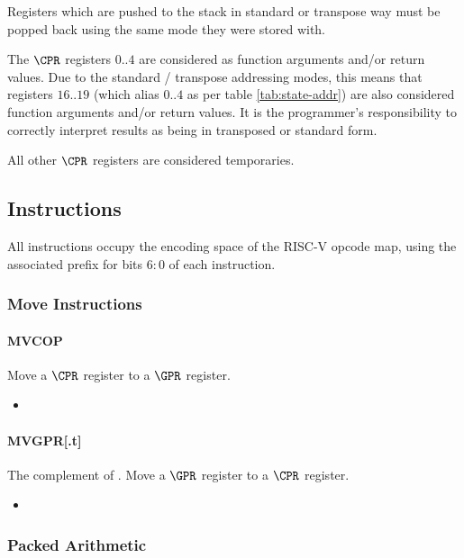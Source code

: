Registers which are pushed to the stack in standard or transpose
way must be popped back using the same mode they were stored with.

The $\CPR$ registers $0..4$ are considered as function arguments
and/or return values. Due to the standard / transpose addressing modes, this
means that registers $16..19$  (which alias $0..4$ as per table \ref{tab:state-addr}) are also considered function arguments and/or return values. It is the
programmer's responsibility to correctly interpret results as being in
transposed or standard form.

All other $\CPR$ registers are considered temporaries.

\subsection{Instructions}

All instructions occupy the \encspace encoding space of the RISC-V opcode
map, using the associated \encopcode prefix for bits $6:0$ of each 
instruction.

\subsubsection{Move Instructions}
\paragraph{MVCOP}

Move a $\CPR$ register to a $\GPR$ register.

\begin{itemize}
\item {}
\end{itemize}


\paragraph{MVGPR[.t]}

The complement of .
Move a $\GPR$ register to a $\CPR$ register.

\begin{itemize}
\item {}
\end{itemize}

\subsubsection{Packed Arithmetic}
